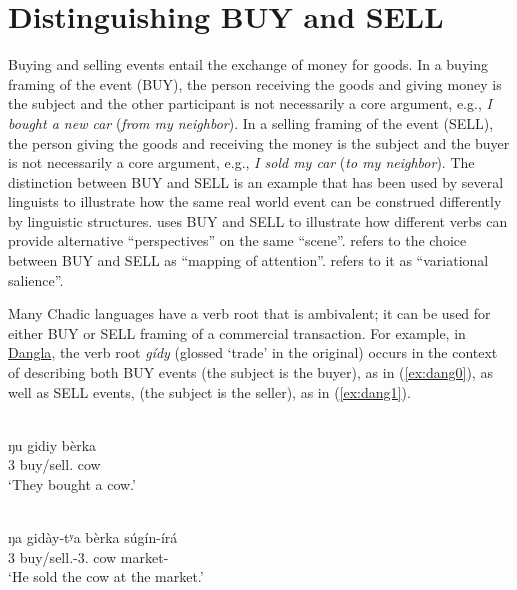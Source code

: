 \section{Distinguishing BUY and SELL} \label{sec:distinguishing}

Buying and selling events entail the exchange of money for goods. In a buying framing of the event (BUY), the person receiving the goods and giving money is the subject and the other participant is not necessarily a core argument, e.g., \textit{I bought a new car} (\textit{from my neighbor}). In a selling framing of the event (SELL), the person giving the goods and receiving the money is the subject and the buyer is not necessarily a core argument, e.g., \textit{I sold my car} (\textit{to my neighbor}). The distinction between BUY and SELL is an example that has been used by several linguists to illustrate how the same real world event can be construed differently by linguistic structures. \citet[25--26]{fillmoreTopicsLexicalSemantics1977} uses BUY and SELL to illustrate how different verbs can provide alternative ``perspectives'' on the same ``scene''.  \citet[77]{talmyCognitiveSemantics2000} refers to the choice between BUY and SELL as ``mapping of attention''. \citet[81]{geeraerts2000salience} refers to it as ``variational salience''. 

Many Chadic languages have a verb root that is ambivalent; it can be used for either BUY or SELL framing of a commercial transaction. For example, in \hyperref[dang]{Dangla}, the verb root \textit{gídy} (glossed `trade' in the original) occurs in the context of describing both BUY events (the subject is the buyer), as in (\ref{ex:dang0}), as well as SELL events, (the subject is the seller), as in (\ref{ex:dang1}). 

\ea\label{ex:dang0}
 \\
\gll ŋu gidiy bèrka \\
3 buy/sell. cow \\
\glt `They bought a cow.'

\ex\label{ex:dang1}
 \\
\gll ŋa gidày-tʸa bèrka súgín-írá \\
3 buy/sell.-3. cow market- \\
\glt `He sold the cow at the market.'
\z

